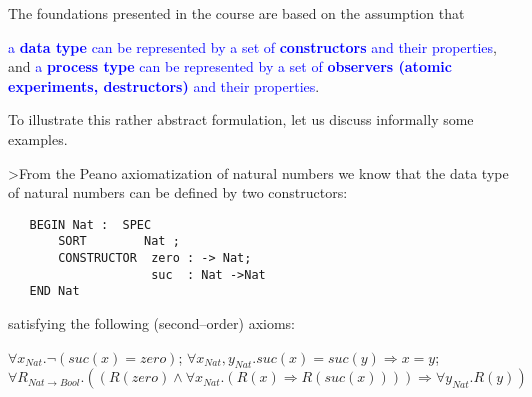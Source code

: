 \documentclass[landscape, autoslides, light]{mmiss}
\newcommand{\ns}{\normalsize}
\begin{document}
\begin{Package}[Label={FSDPT}, Title={Formal Specification of Data and Process Types}, ShortTitle={FSDPT}, Authors={Horst Reichel}, Date={February 2003}, LevelOfDetail=Lecture, Language=en-GB]
\begin{Section}[Title={Introduction}, Label={section2}]
\begin{Paragraph}[Title={Axiomatic Specifications}, Label=Paragraph5]
\end{Paragraph}
\begin{Paragraph}[Title={Basic Intuition}, Label=Paragraph6]
\pause

The foundations presented in the course are based on the
assumption that \pause
\begin{List}[ListType=itemize]
    \ListItem \textcolor{blue}{a \textbf{data type} can be represented
    by a set of \textbf{constructors} and their properties}, and \pause
    \ListItem \textcolor{blue} {a \textbf{process type} can be
    represented by a set of \textbf{observers (atomic experiments, destructors)}
    and their properties}.
\end{List}

\end{Paragraph}
\begin{Paragraph}[Title={Basic Intuition}, Label=Paragraph7]

To illustrate this rather abstract formulation, let us discuss
informally some examples.


\end{Paragraph}
\begin{Paragraph}[Title={Basic Intuition}, Label=Paragraph8]


>From the Peano axiomatization of natural numbers we know that the
data type of natural numbers can be defined by two constructors:
\vspace{8mm} \small
\begin{verbatim}
   BEGIN Nat :  SPEC
       SORT        Nat ;
       CONSTRUCTOR  zero : -> Nat;
                    suc  : Nat ->Nat
   END Nat
\end{verbatim}
\ns


\end{Paragraph}
\begin{Paragraph}[Title={Basic Intuition}, Label=Paragraph9]

satisfying the following (second--order) axioms:\vspace{8mm}

 \begin{List}[ListType=enumerate]
 \ListItem $\forall x_{Nat}. \neg (suc(x) = zero )$; \pause
 \ListItem  $\forall x_{Nat} , y_{Nat} . suc(x) = suc(y) \Rightarrow
    x = y $; \pause
 \ListItem  $\forall R_{Nat \to Bool} . ((R(zero) \wedge \forall x_{Nat} .
   (R(x) \Rightarrow R(suc(x)))) \Rightarrow \forall y_{Nat} .
   R(y))$
 \end{List}


\end{Paragraph}
\end{Section}
\end{Package}
\end{document}
